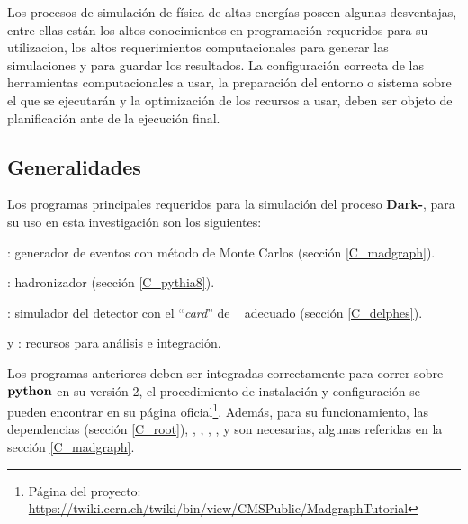 Los procesos de simulación de física de altas energías poseen algunas desventajas, entre ellas están los altos conocimientos en programación requeridos para su utilizacion, los altos requerimientos computacionales para generar las simulaciones y para guardar los resultados. La configuración correcta de las herramientas computacionales a usar, la preparación del entorno o sistema sobre el que se ejecutarán y la optimización de los recursos a usar, deben ser objeto de planificación ante de la ejecución final.

\subsection{Generalidades}
Los programas principales requeridos para la simulación del proceso \textbf{Dark-}\SUSY, para su uso en esta investigación son los siguientes:
\begin{itemize_f}
\item  {}: generador de eventos con método de Monte Carlos (sec\-ción \ref{C_madgraph}). 
\item {}: hadronizador (sec\-ción \ref{C_pythia8}).
\item {}: simulador del detector con el ``\textit{card}'' de \CMS ~ adecuado (sec\-ción \-\ref{C_delphes}).
\item  {} y : recursos para análisis e integración.
\end{itemize_f}

Los programas anteriores de\-ben ser integradas correctamente para correr sobre $\mathbf{py\-thon}$ en su versión 2, el procedimiento de instalación y configuración se pueden encontrar en su página oficial\footnote{ Página del proyecto: \href{https://twiki.cern.ch/twiki/bin/view/CMSPublic/MadgraphTutorial}{https://twiki.cern.ch/twiki/bin/view/CMSPublic/MadgraphTutorial}}. %
Además, para su funcionamiento, las dependencias \ROOT (sec\-ción \ref{C_root}), , , , ,  y  son necesarias, algunas referidas en la sección \ref{C_madgraph}.

